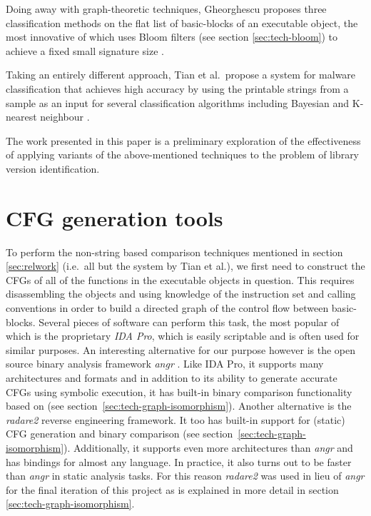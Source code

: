 \documentclass[twocolumn,a4paper]{IEEEtran} %
\begin{document}
Doing away with graph-theoretic techniques, Gheorghescu proposes three classification methods on the flat list of basic-blocks of an executable object, the most innovative of which uses Bloom filters (see section \ref{sec:tech-bloom}) to achieve a fixed small signature size \cite{Gheorghescu2005}.

Taking an entirely different approach, Tian et al.\ propose a system for malware classification that achieves high accuracy by using the printable strings from a sample as an input for several classification algorithms including Bayesian and K-nearest neighbour \cite{Tian2009}.

The work presented in this paper is a preliminary exploration of the effectiveness of applying variants of the above-mentioned techniques to the problem of library version identification.

\section{CFG generation tools}
\label{cfg_tools}
%



To perform the non-string based comparison techniques mentioned in section \ref{sec:relwork} (i.e.~all but the system by Tian et al.), we first need to construct the CFGs of all of the functions in the executable objects in question. This requires disassembling the objects and using knowledge of the instruction set and calling conventions in order to build a directed graph of the control flow between basic-blocks. Several pieces of software can perform this task, the most popular of which is the proprietary \emph{IDA Pro}, which is easily scriptable and is often used for similar purposes. An interesting alternative for our purpose however is the open source binary analysis framework \emph{angr} \cite{Koret2016}. Like IDA Pro, it supports many architectures and formats and in addition to its ability to generate accurate CFGs using symbolic execution, it has built-in binary comparison functionality based on \cite{dullien2005graph} (see section~\ref{sec:tech-graph-isomorphism}).
Another alternative is the \emph{radare2} reverse engineering framework. It too has built-in support for (static) CFG generation and binary comparison (see section~\ref{sec:tech-graph-isomorphism}). Additionally, it supports even more architectures than \emph{angr} and has bindings for almost any language. In practice, it also turns out to be faster than \emph{angr} in static analysis tasks. For this reason \emph{radare2} was used in lieu of \emph{angr} for the final iteration of this project  as is explained in more detail in section \ref{sec:tech-graph-isomorphism}.
\end{document}
